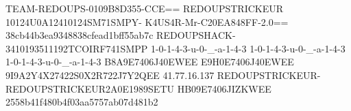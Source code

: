 TEAM-REDOUPS-0109B8D355-CCE==
REDOUPSTRICKEUR 10124U0A12410124SM71SMPY-
K4US4R-Mr-C20EA848FF-2.0==
38cb44b3ea9348838cfead1bff55ab7c
REDOUPSHACK-3410193511192TCOIRF741SMPP
1-0-1-4-3-u-0-_-a-1-4-3
1-0-1-4-3-u-0-_-a-1-4-3
1-0-1-4-3-u-0-_-a-1-4-3
B8A9E7406J40EWEE
E9H0E7406J40EWEE
9I9A2Y4X27422S0X2R722J7Y2QEE
41.77.16.137
REDOUPSTRICKEUR-REDOUPSTRICKEUR2A0E1989SETU
HB09E7406JIZKWEE
2558b41f480b4f03aa5757ab07d481b2
